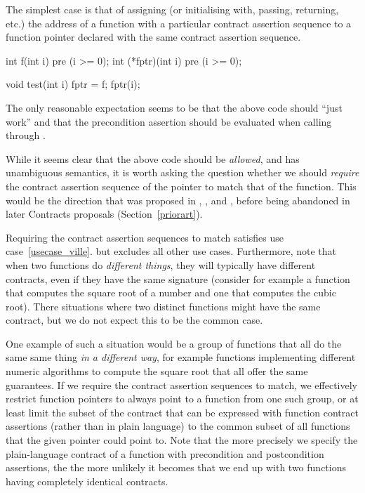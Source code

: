 The simplest case is that of assigning (or initialising with, passing, returning, etc.) the address of a function with a particular contract assertion sequence to a function pointer declared with the same contract assertion sequence. 
\begin{codeblock}
int f(int i) pre (i >= 0);
int (*fptr)(int i) pre (i >= 0);

void test(int i) {
  fptr = f; 
  fptr(i); 
}
\end{codeblock}
The only reasonable expectation seems to be that the above code should ``just work'' and that the precondition assertion  should be evaluated when calling  through .

While it seems clear that the above code should be \emph{allowed}, and has unambiguous semantics, it is worth asking the question whether we should \emph{require} the contract assertion sequence of the pointer to match that of the function. This would be the direction that was proposed in \cite{N4415}, \cite{P0287R0}, and \cite{P0380R0}, before being abandoned in later Contracts proposals (Section~\ref{priorart}).

Requiring the contract assertion sequences to match satisfies use case~\ref{usecase_ville}. but excludes all other use cases. Furthermore, note that when two functions do \emph{different things}, they will typically have different contracts, even if they have the same signature (consider for example a function that computes the square root of a number and one that computes the cubic root). There situations where two distinct functions might have the same contract, but we do not expect this to be the common case.

One example of such a situation would be a group of functions that all do the same same thing \emph{in a different way}, for example functions implementing different numeric algorithms to compute the square root that all offer the same guarantees. If we require the contract assertion sequences to match, we effectively restrict function pointers to always point to a function from one such group, or at least limit the subset of the contract that can be expressed with function contract assertions (rather than in plain language) to the common subset of all functions that the given pointer could point to. Note that the more precisely we specify the plain-language contract of a function with precondition and postcondition assertions, the the more unlikely it becomes that we end up with two functions having completely identical contracts.


